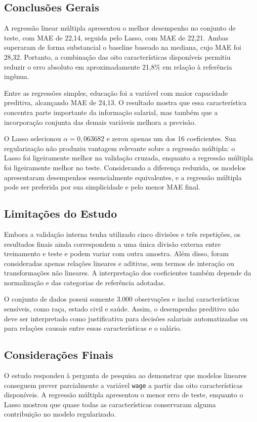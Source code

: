 
\subsection{Conclusões Gerais}

A regressão linear múltipla apresentou o melhor desempenho no conjunto de teste, com MAE de 22,14, seguida pelo Lasso, com MAE de 22,21. Ambas superaram de forma substancial o baseline baseado na mediana, cujo MAE foi 28,32. Portanto, a combinação das oito características disponíveis permitiu reduzir o erro absoluto em aproximadamente 21,8\% em relação à referência ingênua.

Entre as regressões simples, educação foi a variável com maior capacidade preditiva, alcançando MAE de 24,13. O resultado mostra que essa característica concentra parte importante da informação salarial, mas também que a incorporação conjunta das demais variáveis melhora a previsão.

O Lasso selecionou $\alpha=0{,}063682$ e zerou apenas um dos 16 coeficientes. Sua regularização não produziu vantagem relevante sobre a regressão múltipla: o Lasso foi ligeiramente melhor na validação cruzada, enquanto a regressão múltipla foi ligeiramente melhor no teste. Considerando a diferença reduzida, os modelos apresentaram desempenhos essencialmente equivalentes, e a regressão múltipla pode ser preferida por sua simplicidade e pelo menor MAE final.
\subsection{Limitações do Estudo}

Embora a validação interna tenha utilizado cinco divisões e três repetições, os resultados finais ainda correspondem a uma única divisão externa entre treinamento e teste e podem variar com outra amostra. Além disso, foram consideradas apenas relações lineares e aditivas, sem termos de interação ou transformações não lineares. A interpretação dos coeficientes também depende da normalização e das categorias de referência adotadas.

O conjunto de dados possui somente 3.000 observações e inclui características sensíveis, como raça, estado civil e saúde. Assim, o desempenho preditivo não deve ser interpretado como justificativa para decisões salariais automatizadas ou para relações causais entre essas características e o salário.
\subsection{Considerações Finais}

O estudo respondeu à pergunta de pesquisa ao demonstrar que modelos lineares conseguem prever parcialmente a variável \texttt{wage} a partir das oito características disponíveis. A regressão múltipla apresentou o menor erro de teste, enquanto o Lasso mostrou que quase todas as características conservaram alguma contribuição no modelo regularizado.
\newpage
